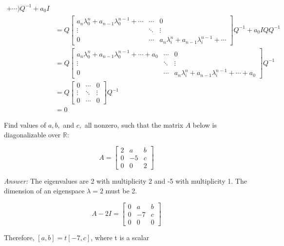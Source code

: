 \documentclass[letterpaper]{article}
\newcommand{\ans}{\textit{Answer: }}
\newenvironment{question}[2][Question]{\begin{trivlist}
\item[\hskip \labelsep {\bfseries #1}\hskip \labelsep {\bfseries #2.}]}{\end{trivlist}}
\begin{document}
\begin{question}{5.36}
\begin{align*}
    +\cdots ) Q^{-1}+a_{0} I \\
    &= Q
    \left[ \begin{array}{ccc}{ a_{n} \lambda_0^n + a_{n-1} \lambda_0^{n-1} + \cdots} & {\cdots} & {0} \\ {\vdots} & {\ddots} & {\vdots} \\ {0} & {\cdots} & { a_{n} \lambda_i^n + a_{n-1} \lambda_i^{n-1} + \cdots}\end{array}\right]
    Q^{-1}+a_{0}IQQ^{-1} \\
    &= Q
    \left[ \begin{array}{ccc}{ a_{n} \lambda_0^n + a_{n-1} \lambda_0^{n-1} + \cdots +a_{0}} & {\cdots} & {0} \\ {\vdots} & {\ddots} & {\vdots} \\ {0} & {\cdots} & { a_{n} \lambda_i^n + a_{n-1} \lambda_i^{n-1} + \cdots +a_{0}}\end{array}\right]
    Q^{-1} \\
    &= Q
    \left[ \begin{array}{ccc}{0} & {\cdots} & {0} \\ {\vdots} & {\ddots} & {\vdots} \\ {0} & {\cdots} & {0}\end{array}\right]
    Q^{-1} \\
    &= 0
  \end{align*}
  
\end{question}

\begin{question}{5.37}
  Find values of $a, b,$ and $c,$ all nonzero, such that the matrix $A$ below is
  diagonalizable over $\mathbb{R} :$

  $$
  A=\left[ \begin{array}{rrr}{2} & {a} & {b} \\ {0} & {-5} & {c} \\ {0} & {0} & {2}\end{array}\right]
  $$

  \ans The eigenvalues are 2 with multiplicity 2 and -5 with multiplicity 1. The dimension
  of an eigenspace $\lambda = 2$ must be 2.  

  $$A-2I=\left[ \begin{array}{rrr}{0} & {a} & {b} \\ {0} & {-7} & {c} \\ {0} & {0} & {0}\end{array}\right]$$
  
  Therefore, $[a, b] = t [-7, c]$, where t is a scalar 


\end{question}
\end{document}
